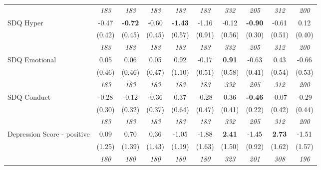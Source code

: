 \begin{tabular}{l c c c c c c c c c}
& \textit{ 183 } & \textit{ 183 } & \textit{ 183 } & \textit{ 183 } & \textit{ 183 } & \textit{ 332 } & \textit{ 205 } & \textit{ 312 } & \textit{ 200 } \\
SDQ Hyper & -0.47 & \textbf{ -0.72 } & -0.60 & \textbf{-1.43} & -1.16 & -0.12 & \textbf{-0.90} & -0.61 & 0.12 \\
& (0.42) & (0.45) & (0.45) & (0.57) & (0.91) & (0.56) & (0.30) & (0.51) & (0.40) \\
& \textit{ 183 } & \textit{ 183 } & \textit{ 183 } & \textit{ 183 } & \textit{ 183 } & \textit{ 332 } & \textit{ 205 } & \textit{ 312 } & \textit{ 200 } \\
SDQ Emotional & 0.05 & 0.06 & 0.05 & 0.92 & -0.17 & \textbf{ 0.91 } & -0.63 & 0.43 & -0.66 \\
& (0.46) & (0.46) & (0.47) & (1.10) & (0.51) & (0.58) & (0.41) & (0.54) & (0.53) \\
& \textit{ 183 } & \textit{ 183 } & \textit{ 183 } & \textit{ 183 } & \textit{ 183 } & \textit{ 332 } & \textit{ 205 } & \textit{ 312 } & \textit{ 200 } \\
SDQ Conduct & -0.28 & -0.12 & -0.36 & 0.37 & -0.28 & 0.36 & \textbf{-0.46} & -0.07 & -0.29 \\
& (0.30) & (0.32) & (0.37) & (0.64) & (0.47) & (0.41) & (0.22) & (0.42) & (0.44) \\
& \textit{ 183 } & \textit{ 183 } & \textit{ 183 } & \textit{ 183 } & \textit{ 183 } & \textit{ 332 } & \textit{ 205 } & \textit{ 312 } & \textit{ 200 } \\
Depression Score - positive & 0.09 & 0.70 & 0.36 & -1.05 & -1.88 & \textbf{ 2.41 } & -1.45 & \textbf{ 2.73 } & -1.51 \\
& (1.25) & (1.39) & (1.43) & (1.19) & (1.63) & (1.50) & (0.92) & (1.62) & (1.57) \\
& \textit{ 180 } & \textit{ 180 } & \textit{ 180 } & \textit{ 180 } & \textit{ 180 } & \textit{ 323 } & \textit{ 201 } & \textit{ 308 } & \textit{ 196 } \\
\bottomrule
\end{tabular}
